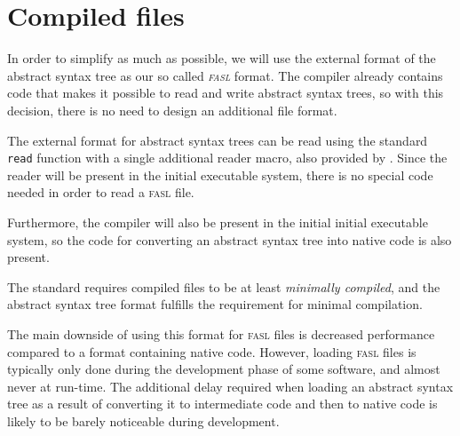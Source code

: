 \chapter{Compiled files}
\label{chap-compiled-files}

In order to simplify \sysname{} as much as possible, we will use the
external format of the \cleavir{} abstract syntax tree as our so
called \emph{\textsc{fasl}} format.  The \cleavir{} compiler already contains
code that makes it possible to read and write abstract syntax trees,
so with this decision, there is no need to design an additional file
format.

The external format for abstract syntax trees can be read using the
\commonlisp{} standard \texttt{read} function with a single additional
reader macro, also provided by \cleavir{}.  Since the \commonlisp{}
reader will be present in the initial executable \sysname{} system,
there is no special code needed in order to read a \textsc{fasl} file.

Furthermore, the compiler will also be present in the initial initial
executable \sysname{} system, so the code for converting an abstract
syntax tree into native code is also present.

The \commonlisp{} standard requires compiled files to be at least
\emph{minimally compiled}, and the abstract syntax tree format
fulfills the requirement for minimal compilation.

The main downside of using this format for \textsc{fasl} files is decreased
performance compared to a format containing native code.  However,
loading \textsc{fasl} files is typically only done during the development phase
of some software, and almost never at run-time.  The additional delay
required when loading an abstract syntax tree as a result of
converting it to intermediate code and then to native code is likely
to be barely noticeable during development.
